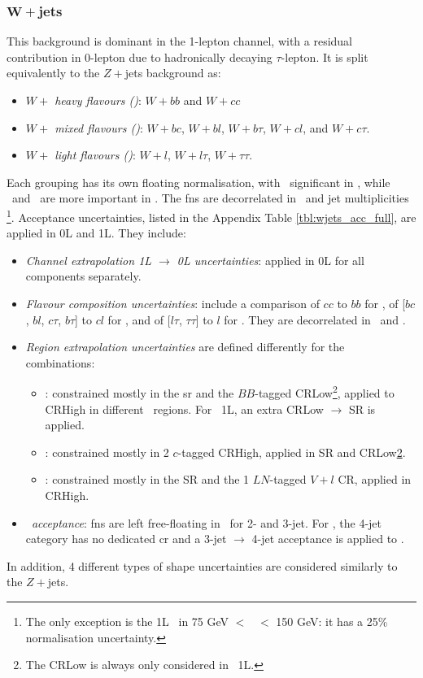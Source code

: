 \subsubsection{$\boldsymbol{W+}$jets}
This background is dominant in the 1-lepton channel, with a residual contribution in 0-lepton due to hadronically decaying $\tau$-lepton. It is split equivalently to the $Z+$jets background as:   
\begin{itemize}
    \item \textit{$W+$ heavy flavours (\whf)}: $W+bb$ and $W+cc$
    \item \textit{$W+$ mixed flavours (\wmf)}: $W+bc$, $W+bl$, $W+b\tau$, $W+cl$, and $W+c\tau$.
    \item \textit{$W+$ light flavours (\wlf)}: $W+l$, $W+l\tau$, $W+\tau\tau$.
\end{itemize}
Each grouping has its own floating normalisation, with \whf\ significant in \vhb, while \wmf\ and \wlf\ are more important in \vhc. The \glspl{fn} are decorrelated in \ptv\ and jet multiplicities \nj\footnote{The only exception is the 1L \wlf\ in 75 GeV $<$ \ptv\ $<$ 150 GeV: it has a 25\% normalisation uncertainty.}. Acceptance uncertainties, listed in the Appendix Table \ref{tbl:wjets_acc_full}, are applied in 0L and 1L. They include:
\begin{itemize}[leftmargin=*]
    \item \textit{Channel extrapolation 1L $\rightarrow$ 0L uncertainties}: applied in 0L for all components separately. 
    \item \textit{Flavour composition uncertainties}: include a comparison of $cc$ to $bb$ for \whf, of [$bc$, $bl$, $c\tau$, $b\tau$] to $cl$ for \wmf, and of [$l\tau$, $\tau\tau$] to $l$ for \wlf. They are decorrelated in \ptv\ and \nj.
    \item \textit{Region extrapolation uncertainties} are defined differently for the combinations:
    \begin{itemize}
        \item \whf: constrained mostly in the \gls{sr} and the $BB$-tagged CRLow\footnote{\label{footnote-crlow}The CRLow is always only considered in \vhb\ 1L.}, applied to CRHigh in different \ptv\ regions. For \vhb\ 1L, an extra CRLow $\rightarrow$ SR is applied. 
        \item \wmf: constrained mostly in 2 $c$-tagged CRHigh, applied in SR and CRLow\cref{footnote-crlow}.
        \item \wlf: constrained mostly in the SR and the 1 $LN$-tagged $V+l$ CR, applied in CRHigh. 
    \end{itemize}
    \item \textit{\nj\ acceptance}: \glspl{fn} are left free-floating in \nj\ for 2- and 3-jet. For \vhb, the 4-jet category has no dedicated \gls{cr} and a 3-jet $\rightarrow$ 4-jet acceptance is applied to \whf.
\end{itemize}
In addition, 4 different types of shape uncertainties are considered similarly to the $Z+$jets.

